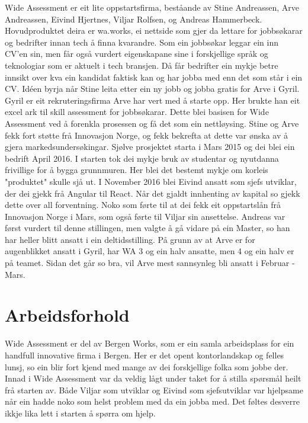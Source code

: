 \documentclass[12pt]{article}
\begin{document}
Wide Assessment er eit lite oppstartsfirma, beståande av Stine Andreassen,
Arve Andreassen, Eivind Hjertnes, Viljar Rolfsen, og Andreas Hammerbeck.
Hovudproduktet deira er wa.works, ei nettside som gjer da lettare for jobbsøkarar
og bedrifter innan tech å finna kvarandre. Som ein jobbsøkar leggar ein inn CV'en
sin, men får også vurdert eigenskapane sine i forskjellige språk og teknologiar
som er aktuelt i tech bransjen. Då får bedrifter ein mykje betre innsikt over
kva ein kandidat faktisk kan og har jobba med enn det som står i ein CV.
Idéen byrja når Stine leita etter ein ny jobb og jobba gratis for Arve i Gyril.
Gyril er eit rekruteringsfirma Arve har vert med å starte opp. Her brukte han
eit excel ark til skill assessment for jobbsøkarar. Dette blei basisen for Wide
Assessment ved å forenkla prosessen og få det som ein nettløysing. Stine og Arve
fekk fort støtte frå Innovasjon Norge, og fekk bekrefta at dette var ønska av å
gjera markedsundersøkingar. Sjølve prosjektet starta i Mars 2015 og dei blei ein
bedrift April 2016. I starten tok dei mykje bruk av studentar og nyutdanna frivillige
for å bygga grunnmuren. Her blei det bestemt mykje om korleis "produktet" skulle
sjå ut. I November 2016 blei Eivind ansatt som sjefs utviklar, der dei gjekk frå
Angular til React. Når det gjaldt innhenting av kapital so gjekk dette over all
forventning. Noko som førte til at dei fekk eit oppstartslån frå Innovasjon Norge
i Mars, som også førte til Viljar sin ansettelse. Andreas var først vurdert til
denne stillingen, men valgte å gå vidare på ein Master, so han har heller blitt
ansatt i ein deltidsstilling. På grunn av at Arve er for augenblikket ansatt i
Gyril, har WA 3 og ein halv ansatte, men 4 og ein halv er på teamet. Sidan det går so
bra, vil Arve mest sannsynleg bli ansatt i Februar - Mars.

\section{Arbeidsforhold}

Wide Assessment er del av Bergen Works, som er ein samla arbeidsplass for ein
handfull innovative firma i Bergen. Her er det opent kontorlandskap og felles
lunsj, so ein blir fort kjend med mange av dei forskjellige folka som jobbe der.
Innad i Wide Assessment var da veldig lågt under taket for å stilla spørsmål heilt
frå starten av. Både Viljar som utviklar og Eivind som sjefsutviklar var hjelpsame
når ein hadde noko som helst problem med da ein jobba med. Det føltes desverre ikkje
lika lett i starten å spørra om hjelp.
\end{document}
